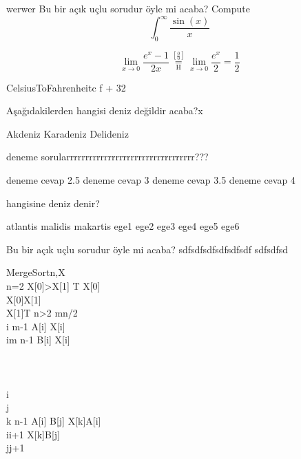 \documentclass[addpoints]{exam}
\begin{document}
\lfoot{}\cfoot{}\begin{questions}
\question werwer
\newpage
\mbox{}
\newpage
\question Bu bir açık uçlu sorudur öyle mi acaba?
\newline
Compute \[\int_{0}^{\infty} \frac{\sin(x)}{x}\]

\[
 \lim_{x\to 0}{\frac{e^x-1}{2x}}
 \overset{\left[\frac{0}{0}\right]}{\underset{\mathrm{H}}{=}}
 \lim_{x\to 0}{\frac{e^x}{2}}={\frac{1}{2}}
\]

\begin{pseudocode}{CelsiusToFahrenheit}{c}
f  + 32\\
\end{pseudocode}





\vspace{25mm}
\question Aşağıdakilerden hangisi deniz değildir acaba?x

\begin{checkboxes}
\choice Akdeniz
\choice Karadeniz
\choice Delideniz
\end{checkboxes}
\question deneme sorularrrrrrrrrrrrrrrrrrrrrrrrrrrrrrrrrr???
\begin{checkboxes}
\choice deneme cevap 2.5
\choice deneme cevap 3
\choice deneme cevap 3.5
\choice deneme cevap 4
\end{checkboxes}
\question hangisine deniz denir?
\begin{checkboxes}
\choice atlantis
\choice malidis
\choice makartis
\choice ege1
\choice ege2
\choice ege3
\choice ege4
\choice ege5
\choice ege6
\end{checkboxes}
\question Bu bir açık uçlu sorudur öyle mi acaba?
sdfsdfsdfsdfsdfsdf
sdfsdfsd

\renewcommand{\thepseudonum}{\roman{pseudonum}}
\begin{pseudocode}{MergeSort}{n,X}
\label{MergeSort}
\\
\IF n=2 \THEN
\BEGIN
\IF X[0]>X[1] \THEN
\BEGIN
T \GETS X[0]\\
X[0]\GETS X[1]\\
X[1]\GETS T
\END
\END
\ELSEIF n>2 \THEN
\BEGIN
m\GETS \lfloor n/2 \rfloor\\
\FOR i \TO m-1 \DO A[i] \GETS X[i]\\
\FOR i\GETS m \TO n-1 \DO B[i] \GETS X[i]\\
\\
\\
\\
i\\
j\\
\FOR k  \TO n-1 \DO
\BEGIN
\IF A[i] \leq B[j] \THEN
\BEGIN
X[k]\GETS A[i] \\
i\GETS i+1
\END
\ELSE
\BEGIN
X[k]\GETS B[j] \\
j\GETS j+1
\END
\END
\END
\end{pseudocode}


\end{questions}
\end{document}
